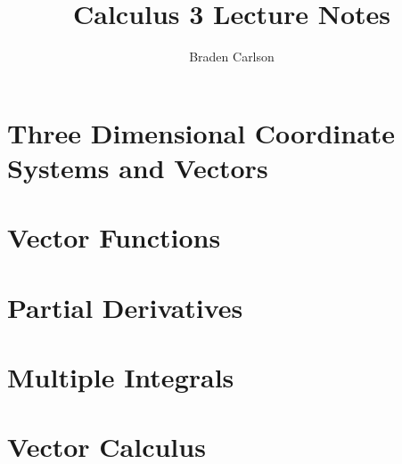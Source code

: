 \documentclass[11pt]{article}
\theoremstyle{definition}
\begin{document}
\title{Calculus 3 Lecture Notes}
\author{Braden Carlson}
\date{}
\maketitle
\tableofcontents
\newpage

\section{Three Dimensional Coordinate Systems and Vectors}








\section{Vector Functions}




\section{Partial Derivatives}









\section{Multiple Integrals}










\section{Vector Calculus}









\end{document}
